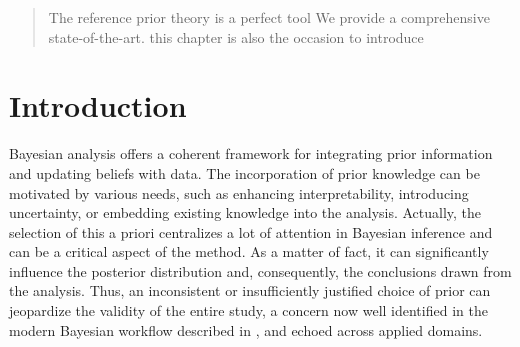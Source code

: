 

\begin{abstract}
    The reference prior theory is a perfect tool 
    We provide a comprehensive state-of-the-art. 
    this chapter is also the occasion to introduce 
\end{abstract}

\minitoc


\section{Introduction}

Bayesian analysis offers a coherent framework for integrating prior information and updating beliefs with data. The incorporation of prior knowledge can be motivated by various needs, such as enhancing interpretability, introducing uncertainty, or embedding existing knowledge into the analysis. Actually, the selection of this a priori centralizes a lot of attention in Bayesian inference and can be a critical aspect of the method. As a matter of fact, it can significantly influence the posterior distribution and, consequently, the conclusions drawn from the analysis. Thus, an inconsistent or insufficiently justified choice of prior can jeopardize the validity of the entire study, a concern now well identified in the modern Bayesian workflow described in \cite{gelman_bayesian_2020}, and echoed across applied domains.

